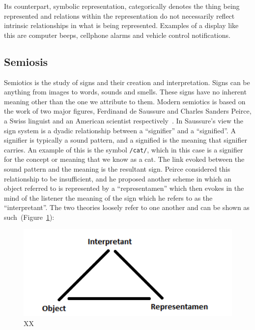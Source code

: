 Its counterpart, symbolic representation, categorically denotes the thing being represented and relations within the representation do not necessarily reflect intrinsic relationships in what is being represented. 
Examples of a display like this are computer beeps, cellphone alarms and vehicle control notifications.



\subsection{Semiosis} %
\label{sub:semiosis}

Semiotics is the study of signs and their creation and interpretation. 
Signs can be anything from images to words, sounds and smells. 
These signs have no inherent meaning other than the one we attribute to them. 
Modern semiotics is based on the work of two major figures, Ferdinand de Saussure and Charles Sanders Peirce, a Swiss linguist and an American scientist respectively~\cite*{Vickers2012}.
In Saussure’s view the sign system is a dyadic relationship between a \enquote{signifier} and a \enquote{signified}.
A signifier is typically a sound pattern, and a signified is the meaning that signifier carries. 
An example of this is the symbol \texttt{/cat/}, which in this case is a signifier for the concept or meaning that we know as a cat. 
The link evoked between the sound pattern and the meaning is the resultant sign. 
Peirce considered this relationship to be insufficient, and he proposed another scheme in which an object referred to is represented by a \enquote{representamen} which then evokes in the mind of the listener the meaning of the sign which he refers to as the \enquote{interpretant}. 
The two theories loosely refer to one another and can be shown as such~\cite*{Vickers2012}(Figure~\ref{fig:semiosis1}):

\begin{figure}[!htbp]
    \centering
    \includegraphics[width=.5\textwidth]{images/Semiosis1.png}
    \caption{XX}
    \label{fig:semiosis1}
\end{figure}



